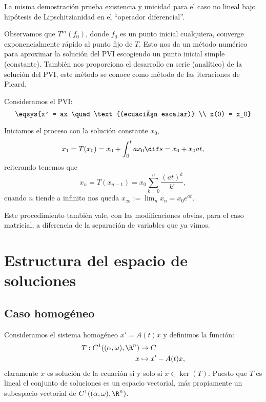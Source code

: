 \documentclass[../ecuaciones_diferenciales.tex]{subfiles}
\begin{document}
\begin{remark}
	La misma demostración prueba existencia y unicidad para el caso no lineal bajo
	hipótesis de Lipschitzianidad en el ``operador diferencial''.
\end{remark}

Observamos que \(T^m(f_0)\), donde \(f_0\) es un punto inicial cualquiera,
converge exponencialmente rápido al punto fijo de \(T\). Esto nos da un método
numérico para aproximar la solución del PVI escogiendo un punto inicial simple
(constante). También nos proporciona el desarrollo en serie (analítico) de la
solución del PVI, este método se conoce como método de las iteraciones de
Picard.

\begin{example}
	Consideramos el PVI:
	\[\eqsys{x' = ax \quad \text{(ecuación escalar)} \\
			x(0) = x_0}\]

	Iniciamos el proceso con la solución constante \(x_0\),
	\[x_1 = T(x_0) = x_0 + \int_0^t a x_0 \dif s = x_0 + x_0 a t,\]
	reiterando tenemos que
	\[x_n = T(x_{n - 1}) = x_0 \sum_{k = 0}^n \frac{(at)^k}{k!},\] cuando \(n\)
	tiende a infinito nos queda \(x_\infty := \lim_n x_n = x_0 e^{at}\).
\end{example}

\begin{remark}
	Este procedimiento también vale, con las modificaciones obvias, para el caso
	matricial, a diferencia de la separación de variables que ya vimos.
\end{remark}

\section{Estructura del espacio de soluciones}

\subsection{Caso homogéneo}

Consideramos el sistema homogéneo \(x' = A(t) x\) y definimos la función:
\begin{align*}
	T : C^1((\alpha, \omega), \R^n) & \to C               \\
	x                               & \mapsto x' - A(t)x,
\end{align*}
claramente \(x\) es solución de la ecuación si y solo si \(x \in \ker(T)\).
Puesto que \(T\) es lineal el conjunto de soluciones es un espacio vectorial,
más propiamente un subespacio vectorial de \(C^1((\alpha, \omega), \R^n)\).
\end{document}
